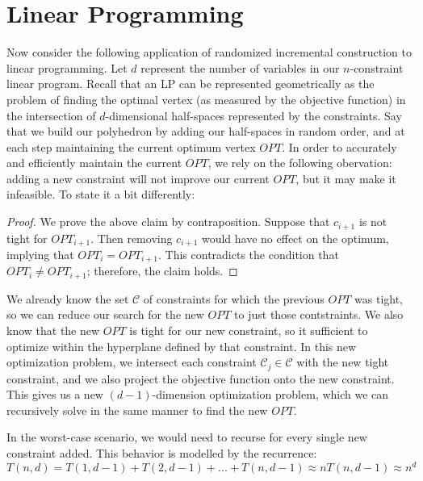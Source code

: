 \documentclass{article}
\begin{document}
\section{Linear Programming}
Now consider the following application of randomized incremental construction to linear 
programming.  Let $d$ represent the number of variables in our $n$-constraint linear program.
Recall that an LP can be represented geometrically as the problem of finding the optimal vertex 
(as measured by the objective function) in the intersection of $d$-dimensional half-spaces 
represented by the constraints.  Say that we build our polyhedron by adding our half-spaces in 
random order, and at each step maintaining the current optimum vertex $OPT$.  In order to accurately 
and efficiently maintain the current $OPT$, we rely on the following obervation: adding a new 
constraint will not improve our current $OPT$, but it may make it infeasible.  To state it a bit 
differently:


\begin{proof}
We prove the above claim by contraposition.  Suppose that $c_{i+1}$ is not tight for $OPT_{i+1}$.  
Then removing $c_{i+1}$ would have no effect on the optimum, implying that $OPT_i = OPT_{i+1}$.  This 
contradicts the condition that $OPT_i \neq OPT_{i+1}$; therefore, the claim holds.
\end{proof}

We already know the set $\mathcal{C}$ of constraints for which the previous $OPT$ was tight, so 
we can reduce our search for the new $OPT$ to just those contstraints.
We also know that the new $OPT$ is tight for our new constraint, so it sufficient to optimize 
within the hyperplane defined by that constraint.  In this new optimization problem, we intersect
each constraint $\mathcal{C}_j \in \mathcal{C}$ with the new tight constraint, and we also project 
the objective function onto the new constraint.  This gives us a new $(d-1)$-dimension optimization 
problem, which we can recursively solve in the same manner to find the new $OPT$.

In the worst-case scenario, we would need to recurse for every single new constraint added.  
This behavior is modelled by the recurrence:
$$T(n,d) = T(1,d-1)+T(2,d-1)+...+T(n,d-1) \approx nT(n,d-1) \approx n^{d}$$
\end{document}
